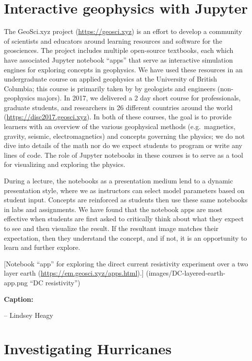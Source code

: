 \documentclass[]{book}
\begin{document}
\section{Interactive geophysics with
Jupyter}\label{interactive-geophysics-with-jupyter}

The GeoSci.xyz project (\url{https://geosci.xyz}) is an effort to
develop a community of scientists and educators around learning
resources and software for the geosciences. The project includes
multiple open-source textbooks, each which have associated Jupyter
notebook ``apps'' that serve as interactive simulation engines for
exploring concepts in geophysics. We have used these resources in an
undergraduate course on applied geophysics at the University of British
Columbia; this course is primarily taken by by geologists and engineers
(non-geophysics majors). In 2017, we delivered a 2 day short course for
professionals, graduate students, and researchers in 26 different
countries around the world (\url{https://disc2017.geosci.xyz}). In both
of these courses, the goal is to provide learners with an overview of
the various geophysical methods (e.g.~magnetics, gravity, seismic,
electromagnetics) and concepts governing the physics; we do not dive
into details of the math nor do we expect students to program or write
any lines of code. The role of Jupyter notebooks in these courses is to
serve as a tool for visualizing and exploring the physics.

During a lecture, the notebooks as a presentation medium lend to a
dynamic presentation style, where we as instructors can select model
parameters based on student input. Concepts are reinforced as students
then use these same notebooks in labs and assignments. We have found
that the notebook apps are most effective when students are first asked
to critically think about what they expect to see and then visualize the
result. If the resultant image matches their expectation, then they
understand the concept, and if not, it is an opportunity to learn and
further explore.

{[}Notebook ``app'' for exploring the direct current resistivity
experiment over a two layer earth
(\url{https://em.geosci.xyz/apps.html}).{]}
(images/DC-layered-earth-app.png ``DC resistivity'')

\textbf{Caption: }

-- Lindsey Heagy

\section{Investigating Hurricanes}\label{investigating-hurricanes}
\end{document}
